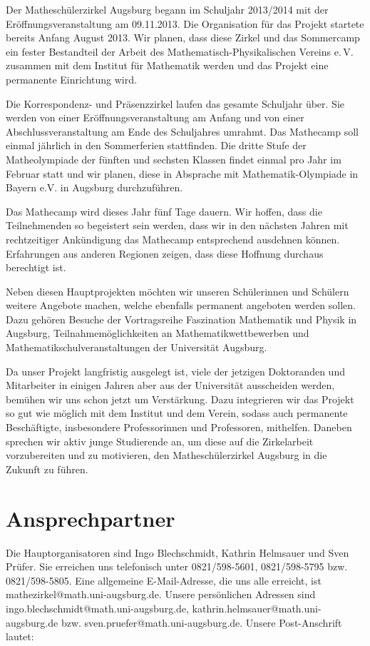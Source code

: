 \documentclass[12pt]{zettel}
\begin{document}
Der Matheschülerzirkel Augsburg begann im Schuljahr 2013/2014 mit der
Eröff\-nungs\-ver\-an\-stal\-tung am 09.11.2013. Die Organisation für das Projekt
startete bereits Anfang August 2013. Wir planen, dass diese Zirkel und
das Sommercamp ein fester Bestandteil der Arbeit des
Mathematisch-Physikalischen Vereins e.\,V. zusammen mit dem Institut für
Mathematik werden und das Projekt eine permanente Einrichtung wird.

Die Korrespondenz- und Präsenzzirkel laufen
das gesamte Schuljahr über. Sie werden von einer
Eröffnungsveranstaltung am Anfang und von einer
Abschlussveranstaltung am Ende des Schuljahres umrahmt. Das Mathecamp soll
einmal jährlich in den Sommerferien stattfinden. Die dritte Stufe der
Matheolympiade der fünften und sechsten Klassen findet einmal pro Jahr
im Februar statt und wir planen, diese in
Absprache mit Mathematik-Olympiade in Bayern e.V. in Augsburg
durchzuführen.

Das Mathecamp wird dieses Jahr fünf Tage dauern. Wir hoffen, dass die
Teilnehmenden so begeistert sein werden,
dass wir in den nächsten Jahren mit rechtzeitiger Ankündigung das
Mathecamp entsprechend ausdehnen können. Erfahrungen aus
anderen Regionen zeigen, dass diese Hoffnung durchaus berechtigt ist.

Neben diesen Hauptprojekten möchten wir unseren Schülerinnen und
Schülern weitere Angebote machen, welche ebenfalls permanent angeboten
werden sollen. Dazu gehören Besuche der Vortragsreihe Faszination
Mathematik und Physik in Augsburg, Teilnahmemöglichkeiten
an Mathematikwettbewerben und Mathematikschulveranstaltungen der Universität Augsburg.

Da unser Projekt langfristig ausgelegt ist, viele der jetzigen Doktoranden und
Mitarbeiter in einigen Jahren aber aus der Universität ausscheiden werden,
bemühen wir uns schon jetzt um Verstärkung.
Dazu integrieren wir das Projekt so gut wie möglich mit
dem Institut und dem Verein, sodass auch permanente Beschäftigte,
insbesondere Professorinnen und Professoren, mithelfen. Daneben sprechen wir
aktiv junge Studierende an, um diese auf die Zirkelarbeit
vorzubereiten und zu motivieren, den Matheschülerzirkel
Augsburg in die Zukunft zu führen.


\section{Ansprechpartner}

Die Hauptorganisatoren sind Ingo Blechschmidt, Kathrin Helmsauer und Sven
Prüfer. Sie erreichen uns telefonisch unter 0821/598-5601, 0821/598-5795 bzw.
0821/598-5805. Eine allgemeine E-Mail-Adresse, die uns alle erreicht, ist
\textsf{mathezirkel@math.uni-augsburg.de}. Unsere persönlichen Adressen sind
\textsf{ingo.blechschmidt@math.uni-augsburg.de},
\textsf{kathrin.helmsauer@math.uni-augsburg.de} bzw.
\textsf{sven.pruefer@math.uni-augsburg.de}. Unsere Post-Anschrift lautet:
\end{document}
